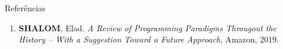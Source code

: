 \begin{frame}[fragile]{Referências}

    \begin{enumerate}
        \item \textbf{SHALOM}, Elad. \textit{A Review of Programming Paradigms Througout the 
            History -- With a Suggestion Toward a Future Approach}, Amazon, 2019.
    \end{enumerate}

\end{frame}
